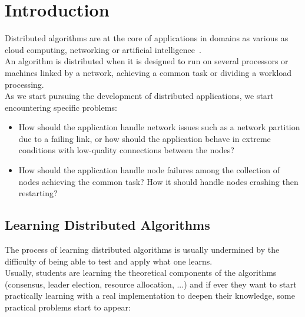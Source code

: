 \documentclass{eplmastersthesis}
\begin{document}
  \tableofcontents

  \chapter{Introduction}

    Distributed algorithms are at the core of applications in domains as
    various as cloud computing, networking or artificial
    intelligence~\cite{DistributedArtificialIntelligence}.\\
    An algorithm is distributed when it is designed to run on several
    processors or machines linked by a network, achieving a common task
    or dividing a workload processing.\\

    As we start pursuing the development of distributed applications,
    we start encountering specific problems:
    \begin{itemize}
      \item How should the application handle network issues such as
      a network partition due to a failing link, or how should the application
      behave in extreme conditions with low-quality connections between
      the nodes?
      \item How should the application handle node failures among the
      collection of nodes achieving the common task? How it should handle
      nodes crashing then restarting?
    \end{itemize}

    \section{Learning Distributed Algorithms}

      The process of learning distributed algorithms is usually undermined by the
      difficulty of being able to test and apply what one learns.\\
      Usually, students are learning the theoretical components of the
      algorithms (consensus, leader election, resource allocation, ...)
      and if ever they want to start practically learning with a real
      implementation to deepen their knowledge, some practical problems
      start to appear:
\end{document}
